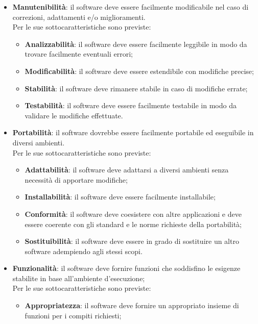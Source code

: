 \documentclass[../piano-di-qualifica.tex]{subfiles}
\begin{document}
\begin{itemize}
    \item \textbf{Manutenibilità}: il software deve essere facilmente modificabile nel caso di correzioni, adattamenti e/o miglioramenti.
        \\Per le sue sottocaratteristiche sono previste:
        \begin{itemize}
            \item \textbf{Analizzabilità}: il software deve essere facilmente leggibile in modo da trovare facilmente eventuali errori;
            \item \textbf{Modificabilità}: il software deve essere estendibile con modifiche precise;
            \item \textbf{Stabilità}: il software deve rimanere stabile in caso di modifiche errate;
            \item \textbf{Testabilità}: il software deve essere facilmente testabile in modo da validare le modifiche effettuate.
        \end{itemize}
        \item \textbf{Portabilità}: il software dovrebbe essere facilmente portabile ed eseguibile in diversi ambienti.
        \\Per le sue sottocaratteristiche sono previste:
        \begin{itemize}
            \item \textbf{Adattabilità}: il software deve adattarsi a diversi ambienti senza necessità di apportare modifiche;
            \item \textbf{Installabilità}: il software deve essere facilmente installabile;
            \item \textbf{Conformità}: il software deve coesistere con altre applicazioni e deve essere coerente con gli standard e le norme richieste della portabilità;
            \item \textbf{Sostituibilità}: il software deve essere in grado di sostituire un altro software adempiendo agli stessi scopi.
        \end{itemize}
        \item \textbf{Funzionalità}: il software deve fornire funzioni che soddisfino le esigenze stabilite in base all'ambiente d'esecuzione;
        \\Per le sue sottocaratteristiche sono previste:
        \begin{itemize}
            \item \textbf{Appropriatezza}: il software deve fornire un appropriato insieme di funzioni per i compiti richiesti;

\end{itemize}
\end{itemize}
\end{document}
